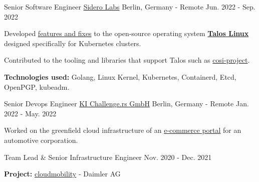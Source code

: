 
\begin{cventries}

    \cventry
    {Senior Software Engineer}
    {\href{https://www.siderolabs.com/}{Sidero Labs}}
    {Berlin, Germany - Remote}
    {Jun. 2022 - Sep. 2022}
    {
        \begin{cvitems}
            \item {
            Developed \href{https://github.com/siderolabs/talos/commits?author=utkuozdemir}{features and fixes} to the open-source operating system \href{https://github.com/siderolabs/talos}{\textbf{Talos Linux}} designed specifically for Kubernetes clusters.
            }
            \item Contributed to the tooling and libraries that support Talos such as \href{https://github.com/cosi-project}{cosi-project}.
            \item {
            \textbf{Technologies used:} Golang, Linux Kernel, Kubernetes, Containerd, Etcd, OpenPGP, kubeadm.
            }
        \end{cvitems}
    }

    \cventry
    {Senior Devops Engineer}
    {\href{https://ki-challengers.com}{KI Challenge.rs GmbH}}
    {Berlin, Germany - Remote}
    {Jan. 2022 - May. 2022}
    {
        \begin{cvitems}
            \item Worked on the greenfield cloud infrastructure of an \href{https://wtx.com}{e-commerce portal} for an automotive corporation.
        \end{cvitems}
    }

    \cventry
    {Team Lead \& Senior Infrastructure Engineer}
    {}
    {}
    {Nov. 2020 - Dec. 2021}
    {
        \begin{cvitems}
            \item {\textbf{Project:} \href{https://cloudmobility.io}{cloudmobility} - Daimler AG}
        \end{cvitems}
    }


\end{cventries}
